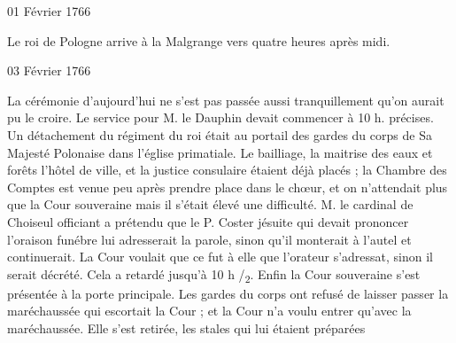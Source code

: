                      \begin{diary}{01 Février 1766}{}


                           Le roi de Pologne arrive à
                              la Malgrange
                           vers quatre heures après midi. \bigskip


                     \end{diary}

                     \begin{diary}{03 Février 1766}{}

                         La cérémonie d'aujourd'hui ne s'est
                           pas
                           passée aussi tranquillement qu'on aurait pu
                           le croire. Le service pour M.
                              le Dauphin
                           devait commencer à 10 h. précises. Un
                           détachement du régiment du
                              roi était au portail
                           des gardes du corps de Sa Majesté Polonaise dans l’église
                              primatiale. Le
                              bailliage, la maitrise
                              des eaux et forêts
                           l'hôtel de ville, et la justice
                           consulaire étaient
                           déjà placés ; la Chambre des
                              Comptes est
                           venue peu après prendre place dans le
                           chœur, et on n'attendait plus que la Cour
                              souveraine mais il s'était élevé une difficulté.
                           M. le cardinal de Choiseul
                           officiant a prétendu
                           que le P. Coster
                           jésuite qui devait prononcer
                           l'oraison funébre lui adresserait la parole,
                           sinon qu'il monterait à l'autel et continuerait.
                           La Cour voulait que ce fut à elle que l'orateur
                           s'adressat, sinon il serait décrété. Cela
                           a retardé jusqu'à 10 h /\textsubscript{2}. Enfin la Cour souveraine
                           s'est présentée à la porte principale. Les
                           gardes du corps ont refusé de laisser passer
                           la maréchaussée qui escortait la Cour ; et la Cour n'a
                           voulu entrer qu'avec la maréchaussée. Elle s'est
                           retirée, les stales qui lui étaient préparées

\end{diary}
